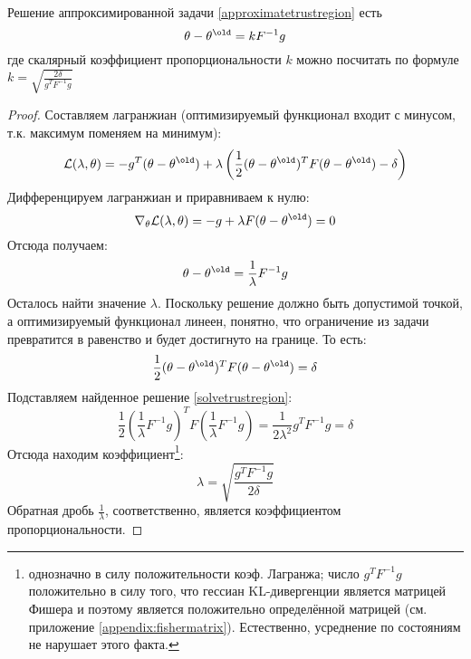 \begin{theorem}
Решение аппроксимированной задачи \eqref{approximatetrustregion} есть
$$\theta - \theta^{\old} = kF^{-1}g$$
где скалярный коэффициент пропорциональности $k$ можно посчитать по формуле $k = \sqrt{\frac{2 \delta}{g^TF^{-1}g}}$
\begin{proof}
Составляем лагранжиан (оптимизируемый функционал входит с минусом, т.к. максимум поменяем на минимум):
$$\mathcal{L}(\lambda, \theta) = -g^T(\theta - \theta^{\old}) + \lambda \left( \frac{1}{2} (\theta - \theta^{\old})^T F (\theta - \theta^{\old}) - \delta \right)$$
Дифференцируем лагранжиан и приравниваем к нулю:
$$\nabla_\theta \mathcal{L}(\lambda, \theta) = -g + \lambda F (\theta - \theta^{\old}) = 0$$
Отсюда получаем:
\begin{equation}\label{solvetrustregion}
\theta - \theta^{\old} = \frac{1}{\lambda} F^{-1}g
\end{equation}
Осталось найти значение $\lambda$. Поскольку решение должно быть допустимой точкой, а оптимизируемый функционал линеен, понятно, что ограничение из задачи превратится в равенство и будет достигнуто на границе. То есть:
$$\frac{1}{2} (\theta - \theta^{\old})^T F (\theta - \theta^{\old}) = \delta$$
Подставляем найденное решение \eqref{solvetrustregion}:
$$\frac{1}{2} \left( \frac{1}{\lambda} F^{-1}g \right)^T F \left( \frac{1}{\lambda} F^{-1}g \right) = \frac{1}{2 \lambda^2} g^TF^{-1}g = \delta$$
Отсюда находим коэффициент\footnote[*]{однозначно в силу положительности коэф. Лагранжа; число $g^TF^{-1}g$ положительно в силу того, что гессиан KL-дивергенции является матрицей Фишера и поэтому является положительно определённой матрицей (см. приложение \ref{appendix:fishermatrix}). Естественно, усреднение по состояниям не нарушает этого факта.}:
$$\lambda = \sqrt{\frac{g^TF^{-1}g}{2 \delta}}$$
Обратная дробь $\frac{1}{\lambda}$, соответственно, является коэффициентом пропорциональности.
\end{proof}
\end{theorem}

